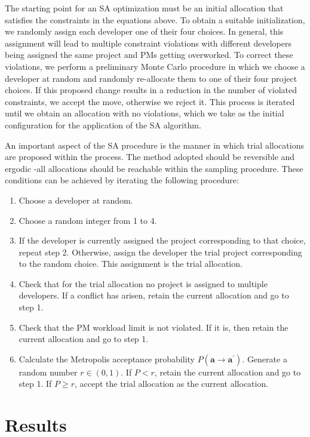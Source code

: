 \documentclass[11pt]{article}
\providecommand{\tightlist}{%
      \setlength{\itemsep}{0pt}\setlength{\parskip}{0pt}}
\def\lt{<}
\begin{document}
The starting point for an SA optimization must be an initial allocation
that satisfies the constraints in the equations above. To obtain a
suitable initialization, we randomly assign each developer one of their
four choices. In general, this assignment will lead to multiple
constraint violations with different developers being assigned the same
project and PMs getting overworked. To correct these violations, we
perform a preliminary Monte Carlo procedure in which we choose a
developer at random and randomly re-allocate them to one of their four
project choices. If this proposed change results in a reduction in the
number of violated constraints, we accept the move, otherwise we reject
it. This process is iterated until we obtain an allocation with no
violations, which we take as the initial configuration for the
application of the SA algorithm.

An important aspect of the SA procedure is the manner in which trial
allocations are proposed within the process. The method adopted should
be reversible and ergodic -all allocations should be reachable within
the sampling procedure. These conditions can be achieved by iterating
the following procedure:

\begin{enumerate}
\def\labelenumi{\arabic{enumi}.}
\tightlist
\item
  Choose a developer at random.
\item
  Choose a random integer from 1 to 4.
\item
  If the developer is currently assigned the project corresponding to
  that choice, repeat step 2. Otherwise, assign the developer the trial
  project corresponding to the random choice. This assignment is the
  trial allocation.
\item
  Check that for the trial allocation no project is assigned to multiple
  developers. If a conflict has arisen, retain the current allocation
  and go to step 1.
\item
  Check that the PM workload limit is not violated. If it is, then
  retain the current allocation and go to step 1.
\item
  Calculate the Metropolis acceptance probability
  \(P(\mathbf{a} \to \mathbf{a^\prime})\). Generate a random number
  \(r \in (0,1)\). If \(P \lt r\), retain the current allocation and go
  to step 1. If \(P \geq r\), accept the trial allocation as the current
  allocation.
\end{enumerate}

    \section{Results}\label{results}
\end{document}

